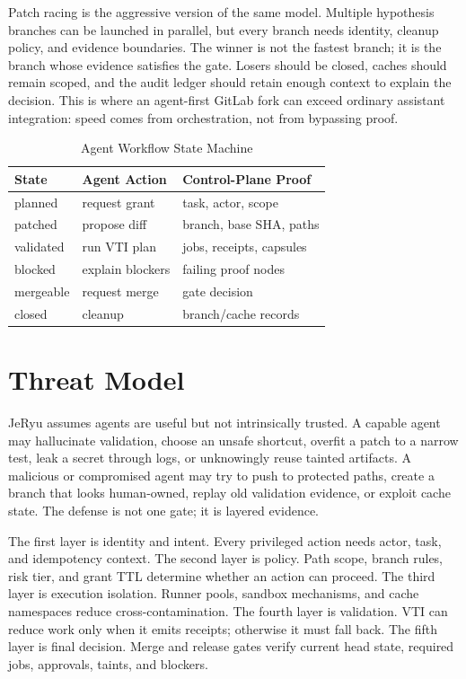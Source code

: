 \documentclass[conference]{IEEEtran}
\begin{document}
Patch racing is the aggressive version of the same model. Multiple hypothesis branches can be launched in parallel, but every branch needs identity, cleanup policy, and evidence boundaries. The winner is not the fastest branch; it is the branch whose evidence satisfies the gate. Losers should be closed, caches should remain scoped, and the audit ledger should retain enough context to explain the decision. This is where an agent-first GitLab fork can exceed ordinary assistant integration: speed comes from orchestration, not from bypassing proof.

\begin{table}[t]
\caption{Agent Workflow State Machine}
\centering
\begin{tabular}{lll}
\toprule
State & Agent Action & Control-Plane Proof\\
\midrule
planned & request grant & task, actor, scope\\
patched & propose diff & branch, base SHA, paths\\
validated & run VTI plan & jobs, receipts, capsules\\
blocked & explain blockers & failing proof nodes\\
mergeable & request merge & gate decision\\
closed & cleanup & branch/cache records\\
\bottomrule
\end{tabular}
\end{table}

\section{Threat Model}
JeRyu assumes agents are useful but not intrinsically trusted. A capable agent may hallucinate validation, choose an unsafe shortcut, overfit a patch to a narrow test, leak a secret through logs, or unknowingly reuse tainted artifacts. A malicious or compromised agent may try to push to protected paths, create a branch that looks human-owned, replay old validation evidence, or exploit cache state. The defense is not one gate; it is layered evidence.

The first layer is identity and intent. Every privileged action needs actor, task, and idempotency context. The second layer is policy. Path scope, branch rules, risk tier, and grant TTL determine whether an action can proceed. The third layer is execution isolation. Runner pools, sandbox mechanisms, and cache namespaces reduce cross-contamination. The fourth layer is validation. VTI can reduce work only when it emits receipts; otherwise it must fall back. The fifth layer is final decision. Merge and release gates verify current head state, required jobs, approvals, taints, and blockers.
\end{document}
